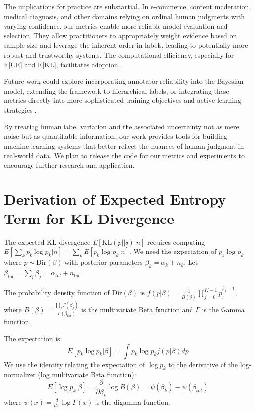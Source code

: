 \documentclass[journal]{IEEEtran}
\begin{document}
The implications for practice are substantial. In e-commerce, content moderation, medical diagnosis, and other domains relying on ordinal human judgments with varying confidence, our metrics enable more reliable model evaluation and selection. They allow practitioners to appropriately weight evidence based on sample size and leverage the inherent order in labels, leading to potentially more robust and trustworthy systems. The computational efficiency, especially for E[CE] and E[KL], facilitates adoption.

Future work could explore incorporating annotator reliability into the Bayesian model, extending the framework to hierarchical labels, or integrating these metrics directly into more sophisticated training objectives and active learning strategies \cite{settles2009}.

By treating human label variation and the associated uncertainty not as mere noise but as quantifiable information, our work provides tools for building machine learning systems that better reflect the nuances of human judgment in real-world data. We plan to release the code for our metrics and experiments to encourage further research and application.


\appendix
\section{Derivation of Expected Entropy Term for KL Divergence}
\label{app:entropy_derivation}

The expected KL divergence $E[\text{KL}(p||q)|n]$ requires computing $E[\sum_k p_k \log p_k | n] = \sum_k E[p_k \log p_k | n]$. We need the expectation of $p_k \log p_k$ where $p \sim \text{Dir}(\beta)$ with posterior parameters $\beta_k = \alpha_k + n_k$. Let $\beta_{tot} = \sum_j \beta_j = \alpha_{tot} + n_{tot}$.

The probability density function of $\text{Dir}(\beta)$ is $f(p|\beta) = \frac{1}{B(\beta)} \prod_{j=0}^{K-1} p_j^{\beta_j-1}$, where $B(\beta) = \frac{\prod_j \Gamma(\beta_j)}{\Gamma(\beta_{tot})}$ is the multivariate Beta function and $\Gamma$ is the Gamma function.

The expectation is:
\begin{equation}
E[p_k \log p_k | \beta] = \int p_k \log p_k f(p|\beta) dp
\end{equation}
We use the identity relating the expectation of $\log p_k$ to the derivative of the log-normalizer (log multivariate Beta function):
\begin{equation}
E[\log p_k | \beta] = \frac{\partial}{\partial \beta_k} \log B(\beta) = \psi(\beta_k) - \psi(\beta_{tot})
\end{equation}
where $\psi(x) = \frac{d}{dx} \log \Gamma(x)$ is the digamma function.
\end{document}
